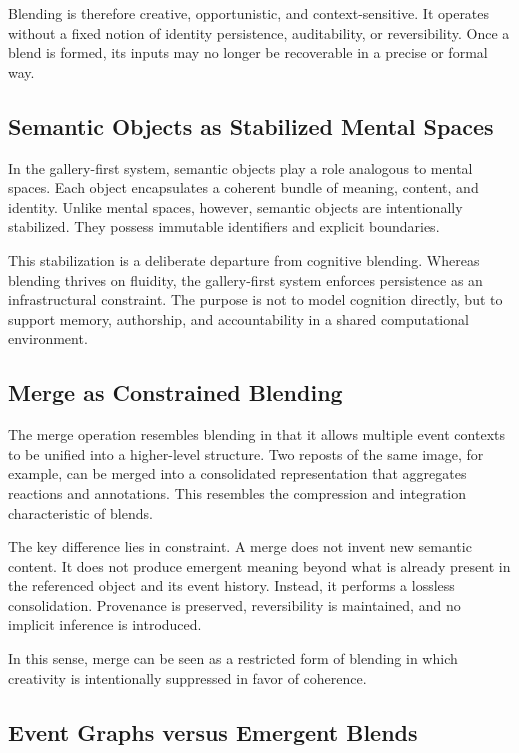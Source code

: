 \documentclass[11pt,oneside]{article}
\begin{document}
Blending is therefore creative, opportunistic, and context-sensitive. It operates without a fixed notion of identity persistence, auditability, or reversibility. Once a blend is formed, its inputs may no longer be recoverable in a precise or formal way.

\subsection{Semantic Objects as Stabilized Mental Spaces}

In the gallery-first system, semantic objects play a role analogous to mental spaces. Each object encapsulates a coherent bundle of meaning, content, and identity. Unlike mental spaces, however, semantic objects are intentionally stabilized. They possess immutable identifiers and explicit boundaries.

This stabilization is a deliberate departure from cognitive blending. Whereas blending thrives on fluidity, the gallery-first system enforces persistence as an infrastructural constraint. The purpose is not to model cognition directly, but to support memory, authorship, and accountability in a shared computational environment.

\subsection{Merge as Constrained Blending}

The merge operation resembles blending in that it allows multiple event contexts to be unified into a higher-level structure. Two reposts of the same image, for example, can be merged into a consolidated representation that aggregates reactions and annotations. This resembles the compression and integration characteristic of blends.

The key difference lies in constraint. A merge does not invent new semantic content. It does not produce emergent meaning beyond what is already present in the referenced object and its event history. Instead, it performs a lossless consolidation. Provenance is preserved, reversibility is maintained, and no implicit inference is introduced.

In this sense, merge can be seen as a restricted form of blending in which creativity is intentionally suppressed in favor of coherence.

\subsection{Event Graphs versus Emergent Blends}
\end{document}
